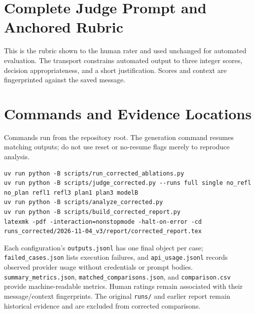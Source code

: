 \documentclass{article}
\begin{document}


\clearpage\appendix\onecolumn
\section{Complete Judge Prompt and Anchored Rubric}\label{app:rubric}
This is the rubric shown to the human rater and used unchanged for automated evaluation. The transport constrains automated output to three integer scores, decision appropriateness, and a short justification. Scores and context are fingerprinted against the saved message.

\section{Commands and Evidence Locations}
Commands run from the repository root. The generation command resumes matching outputs; do not use reset or no-resume flags merely to reproduce analysis.
\begin{lstlisting}
uv run python -B scripts/run_corrected_ablations.py
uv run python -B scripts/judge_corrected.py --runs full single no_refl no_plan refl1 refl3 plan1 plan3 modelB
uv run python -B scripts/analyze_corrected.py
uv run python -B scripts/build_corrected_report.py
latexmk -pdf -interaction=nonstopmode -halt-on-error -cd runs_corrected/2026-11-04_v3/report/corrected_report.tex
\end{lstlisting}
Each configuration's \texttt{outputs.jsonl} has one final object per case; \texttt{failed\_cases.json} lists execution failures, and \texttt{api\_usage.jsonl} records observed provider usage without credentials or prompt bodies. \texttt{summary\_metrics.json}, \texttt{matched\_comparisons.json}, and \texttt{comparison.csv} provide machine-readable metrics. Human ratings remain associated with their message/context fingerprints. The original \texttt{runs/} and earlier report remain historical evidence and are excluded from corrected comparisons.
\end{document}
